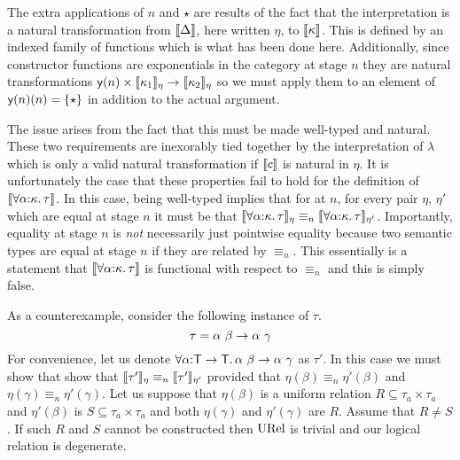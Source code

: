 The extra applications of $n$ and $\star$ are results of the fact that
the interpretation is a natural transformation from $\llbracket \Delta \rrbracket$,
here written $\eta$, to $\llbracket \kappa \rrbracket$. This is defined by an indexed
family of functions which is what has been done here. Additionally,
since constructor functions are exponentials in the category at stage
$n$ they are natural transformations
$\mathsf{y}(n) \times \llbracket \kappa_1 \rrbracket_\eta \to \llbracket \kappa_2 \rrbracket_\eta$ so we
must apply them to an element of $\mathsf{y}(n)(n) = \{\star\}$ in
addition to the actual argument.

The issue arises from the fact that this must be made well-typed and
natural. These two requirements are inexorably tied together by the
interpretation of $\lambda$ which is only a valid natural
transformation if $\llbracket c \rrbracket$ is natural in $\eta$. It is unfortunately
the case that these properties fail to hold for the definition of
$\llbracket \forall \alpha {:} \kappa.\, \tau \rrbracket$. In this case, being well-typed
implies that for at $n$, for every pair $\eta$, $\eta'$ which are
equal at stage $n$ it must be that
$\llbracket \forall \alpha {:} \kappa.\, \tau \rrbracket_\eta \equiv_n \llbracket \forall \alpha {:} \kappa.\, \tau \rrbracket_{\eta'}$.
Importantly, equality at stage $n$ is \emph{not} necessarily just
pointwise equality because two semantic types are equal at stage $n$
if they are related by $\equiv_n$. This essentially is a statement
that $\llbracket \forall \alpha {:} \kappa.\, \tau \rrbracket$ is functional with respect to
$\equiv_n$ and this is simply false.

As a counterexample, consider the following instance of $\tau$.
\[
  \tau = \alpha\ \beta \to \alpha\ \gamma
\]
For convenience, let us denote
$\forall \alpha {:} \mathsf{T} \to \mathsf{T}.\, \alpha\ \beta \to \alpha\ \gamma$
as $\tau'$. In this case we must show that show that
$\llbracket \tau' \rrbracket_\eta \equiv_n \llbracket \tau' \rrbracket_{\eta'}$ provided that
$\eta(\beta) \equiv_n \eta'(\beta)$ and
$\eta(\gamma) \equiv_n \eta'(\gamma)$. Let us suppose that
$\eta(\beta)$ is a uniform relation $R \subseteq \tau_a \times \tau_a$
and $\eta'(\beta)$ is $S \subseteq \tau_a \times \tau_a$ and both
$\eta(\gamma)$ and $\eta'(\gamma)$ are $R$. Assume that $R \neq S$. If
such $R$ and $S$ cannot be constructed then $\mathrm{URel}$ is trivial and
our logical relation is degenerate.


